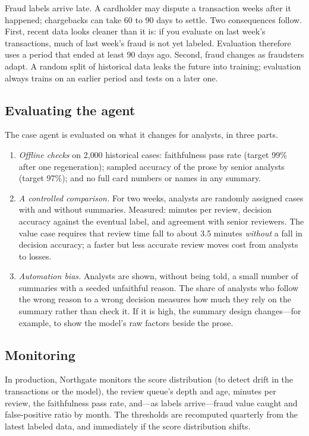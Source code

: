 Fraud labels arrive late. A cardholder may dispute a transaction weeks after it happened; chargebacks can take 60 to 90 days to settle. Two consequences follow. First, recent data looks cleaner than it is: if you evaluate on last week's transactions, much of last week's fraud is not yet labeled. Evaluation therefore uses a period that ended at least 90 days ago. Second, fraud changes as fraudsters adapt. A random split of historical data leaks the future into training; evaluation always trains on an earlier period and tests on a later one.

\subsection{Evaluating the agent}

The case agent is evaluated on what it changes for analysts, in three parts.
\begin{enumerate}[itemsep=2pt]
  \item \emph{Offline checks} on 2{,}000 historical cases: faithfulness pass rate (target 99\% after one regeneration); sampled accuracy of the prose by senior analysts (target 97\%); and no full card numbers or names in any summary.
  \item \emph{A controlled comparison.} For two weeks, analysts are randomly assigned cases with and without summaries. Measured: minutes per review, decision accuracy against the eventual label, and agreement with senior reviewers. The value case requires that review time fall to about 3.5 minutes \emph{without} a fall in decision accuracy; a faster but less accurate review moves cost from analysts to losses.
  \item \emph{Automation bias.} Analysts are shown, without being told, a small number of summaries with a seeded unfaithful reason. The share of analysts who follow the wrong reason to a wrong decision measures how much they rely on the summary rather than check it. If it is high, the summary design changes---for example, to show the model's raw factors beside the prose.
\end{enumerate}

\subsection{Monitoring}

In production, Northgate monitors the score distribution (to detect drift in the transactions or the model), the review queue's depth and age, minutes per review, the faithfulness pass rate, and---as labels arrive---fraud value caught and false-positive ratio by month. The thresholds are recomputed quarterly from the latest labeled data, and immediately if the score distribution shifts.

